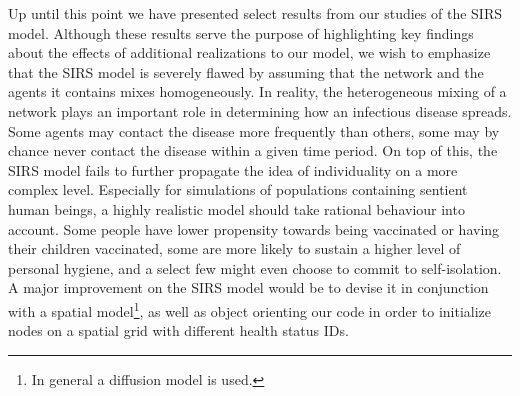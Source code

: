 Up until this point we have presented select results from our studies of the SIRS model. Although these results serve the purpose of highlighting key findings about the effects of additional realizations to our model, we wish to emphasize that the SIRS model is severely flawed by assuming that the network and the agents it contains mixes homogeneously. In reality, the heterogeneous mixing of a network plays an important role in determining how an infectious disease spreads. Some agents may contact the disease more frequently than others, some may by chance never contact the disease within a given time period. On top of this, the SIRS model fails to further propagate the idea of individuality on a more complex level. Especially for simulations of populations containing sentient human beings, a highly realistic model should take rational behaviour into account. Some people have lower propensity towards being vaccinated or having their children vaccinated, some are more likely to sustain a higher level of personal hygiene, and a select few might even choose to commit to self-isolation. A major improvement on the SIRS model would be to devise it in conjunction with a spatial model\footnote{In general a diffusion model is used.}, as well as object orienting our code in order to initialize nodes on a spatial grid with different health status IDs.